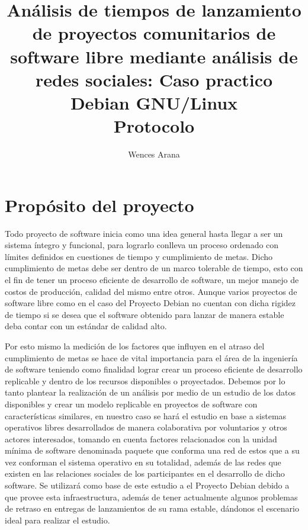 \documentclass[12pt]{report}
\begin{document}
  \title{ {Análisis  de  tiempos  de  lanzamiento  de
proyectos comunitarios  de software  libre mediante análisis  de redes
sociales:   Caso   practico    Debian   GNU/Linux}
\\   {Protocolo}   }
\author{Wences Arana}
\maketitle

\tableofcontents
\chapter*{Propósito del proyecto}

Todo proyecto de software inicia como una idea general hasta llegar a
ser un sistema íntegro y funcional, para lograrlo conlleva un proceso
ordenado con límites definidos en cuestiones de tiempo y cumplimiento
de metas.  Dicho cumplimiento de metas debe ser dentro de un marco
tolerable de tiempo, esto con el fin de tener un proceso eficiente de
desarrollo de software, un mejor manejo de costos de producción,
calidad del mismo entre otros. Aunque varios proyectos de
software libre como en el caso del Proyecto Debian no cuentan con
dicha rigidez de tiempo si se desea que el software obtenido para
lanzar de manera estable deba contar con un estándar de calidad alto.

Por esto mismo la medición de los factores que influyen en el atraso
del cumplimiento de metas se hace de vital importancia para el área de
la ingeniería de software teniendo como finalidad lograr crear un
proceso eficiente de desarrollo replicable y dentro de los recursos
disponibles o proyectados. Debemos por lo tanto plantear la
realización de un análisis por medio de un estudio de los datos
disponibles y crear un modelo replicable en proyectos de software con
características similares, en nuestro caso se hará el estudio en base
a sistemas operativos libres desarrollados de manera colaborativa por
voluntarios y otros actores interesados, tomando en cuenta factores
relacionados con la unidad mínima de software denominada paquete que
conforma una red de estos que a su vez conforman el sistema operativo
en su totalidad, además de las redes que existen en las relaciones
sociales de los participantes en el desarrollo de dicho software. Se
utilizará como base de este estudio a el Proyecto Debian debido a que
provee esta infraestructura, además de tener actualmente algunos
problemas de retraso en entregas de lanzamientos de su rama estable,
dándonos el escenario ideal para realizar el estudio.
\end{document}
